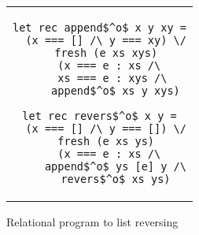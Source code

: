 \begin{figure}
\centering
\begin{tabular}{c}
\begin{lstlisting}
let rec append$^o$ x y xy =
  (x === [] /\ y === xy) \/
  fresh (e xs xys)
    (x === e : xs /\ 
     xs === e : xys /\ 
     append$^o$ xs y xys)
    
let rec revers$^o$ x y =
  (x === [] /\ y === []) \/
  fresh (e xs ys)
    (x === e : xs /\ 
     append$^o$ ys [e] y /\
     revers$^o$ xs ys)
\end{lstlisting}
\end{tabular}

\caption{Relational program to list reversing}
\label{fair:lst-reverso}
\end{figure}

\FloatBarrier